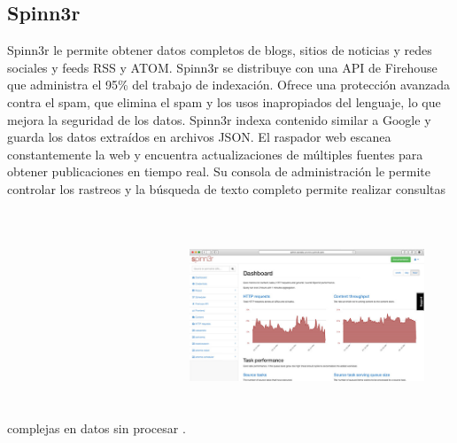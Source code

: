 \documentclass[twoside,twocolumn]{article}
\begin{document}
\subsection{Spinn3r}

Spinn3r le permite obtener datos completos de blogs, sitios de noticias y
 redes sociales y feeds RSS y ATOM. Spinn3r se distribuye con una API de
  Firehouse que administra el 95\% del trabajo de indexación. 
  Ofrece una protección avanzada contra el spam, que elimina el 
  spam y los usos inapropiados del lenguaje, lo que mejora la 
  seguridad de los datos.
Spinn3r indexa contenido similar a Google y guarda los datos extraídos
 en archivos JSON. El raspador web escanea constantemente la web y encuentra
  actualizaciones de múltiples fuentes para obtener publicaciones en tiempo real.
   Su consola de administración le permite controlar los rastreos y la búsqueda 
   de texto completo permite realizar consultas complejas en datos sin procesar .
   \includegraphics[width=7cm, height=7cm]{imagenes/8.png}
\end{document}
